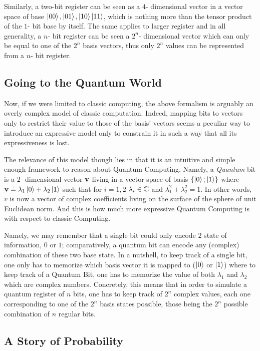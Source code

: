 \documentclass[a4paper]{article}
\begin{document}
Similarly, a two-bit register can be seen as a $4$- dimensional vector in a vector space of base $\left| 00 \right>, \left| 01 \right>, \left| 10 \right> \left| 11 \right>$, which is nothing more than the tensor product of the $1$- bit base by itself. The same applies to larger register and in all generality, a $n$- bit register can be seen a $2^n$- dimensional vector which can only be equal to one of the $2^n$ basis vectors, thus only $2^n$ values can be represented from a $n$- bit register.

\subsection{Going to the Quantum World}

Now, if we were limited to classic computing, the above formalism is arguably an overly complex model of classic computation. Indeed, mapping bits to vectors only to restrict their value to those of the basis’ vectors seems a peculiar way to introduce an expressive model only to constrain it in such a way that all its expressiveness is lost.

The relevance of this model though lies in that it is an intuitive and simple enough framework to reason about Quantum Computing. Namely, a \emph{Quantum} bit is a $2$- dimensional vector $\mathbf{v}$ living in a vector space of basis $\lbrace \left| 0 \right>; \left| 1 \right> \rbrace$ where 
$\mathbf{v} \doteq \lambda_1 \left| 0 \right> + \lambda_2 \left| 1 \right>$ such that for $i = 1, 2$ $\lambda_i \in \mathbb{C}$ and $\lambda_1^2 + \lambda_2^2 = 1$. In other words, $v$ is now a vector of complex coefficients living on the surface of the sphere of unit Euclidean norm. And this is how much more expressive Quantum Computing is with respect to classic Computing.

Namely, we may remember that a single bit could only encode $2$ state of information, $0$ or $1$; comparatively, a quantum bit can encode any (complex) combination of these two base state. In a nutshell, to keep track of a single bit, one only has to memorize which basis vector it is mapped to ($\left| 0 \right>$ or $\left| 1 \right>$) where to keep track of a Quantum Bit, one has to memorize the value of both $\lambda_1$ and $\lambda_2$ which are complex numbers. Concretely, this means that in order to simulate a quantum register of $n$ bits, one has to keep track of $2^n$ complex values, each one corresponding to one of the $2^n$ basis states possible, those being the $2^n$ possible combination of $n$ regular bits. 

\subsection{A Story of Probability}
\end{document}
